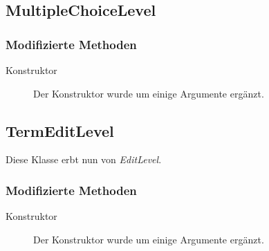 \subsection{MultipleChoiceLevel}

	\subsubsection{Modifizierte Methoden}
		\begin{description}
			\item[Konstruktor] Der Konstruktor wurde um einige Argumente ergänzt.
		\end{description}



\subsection{TermEditLevel}
	Diese Klasse erbt nun von \emph{EditLevel}.

	\subsubsection{Modifizierte Methoden}
		\begin{description}
			\item[Konstruktor] Der Konstruktor wurde um einige Argumente ergänzt.
		\end{description}

